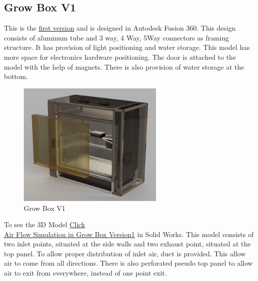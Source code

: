 \documentclass[a4paper,12pt,oneside]{book}
\begin{document}
\subsection{Grow Box V1}
This is the \href{https://www.youtube.com/watch?v=sGrjrwHcsWk}{first version} and is designed in Autodesk Fusion 360. This design consists of aluminum tube and 3 way, 4 Way, 5Way connectors as framing structure. It has provision of light positioning and water storage. This model has more space for electronics hardware positioning. The  door is attached to the model with the help of magnets. There is also provision of water storage at the bottom.   \\
\begin{figure}[h!]\begin{center}
\includegraphics[width=200pt]{version1}
\end{center}\caption{Grow Box V1}
\end{figure}
To see the 3D Model  \href{http://a360.co/2rCJyYc}{Click}\\
\href{https://www.youtube.com/watch?v=ab_HcFKEwkE}{Air Flow Simulation in Grow Box Version1} in Solid Works. This model consists of two inlet points, situated at the side walls and two exhaust point, situated at the top panel. To allow proper distribution of inlet air, duct is provided. This allow air to come from all directions. There is also perforated pseudo top panel to allow air to exit from  everywhere, instead of one point exit.
\end{document}
